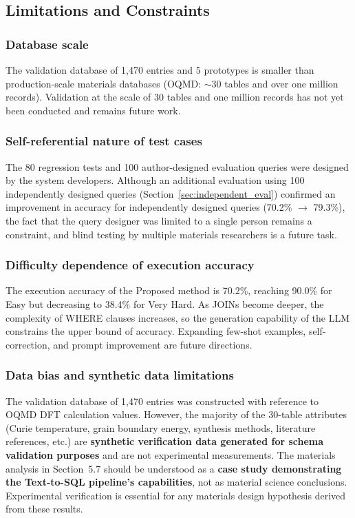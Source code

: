 \documentclass[5p,twocolumn]{elsarticle}
\begin{document}
\subsection{Limitations and Constraints}
\label{sec:limitations}

\subsubsection{Database scale}

The validation database of 1{,}470 entries and 5 prototypes
is smaller than production-scale materials databases (OQMD: ${\sim}30$ tables and over one million records).
Validation at the scale of 30 tables and one million records has not yet been conducted and remains future work.

\subsubsection{Self-referential nature of test cases}

The 80 regression tests and 100 author-designed evaluation queries
were designed by the system developers.
Although an additional evaluation using 100 independently designed queries (Section~\ref{sec:independent_eval})
confirmed an improvement in accuracy for independently designed queries (70.2\% $\to$ 79.3\%),
the fact that the query designer was limited to a single person remains a constraint,
and blind testing by multiple materials researchers is a future task.

\subsubsection{Difficulty dependence of execution accuracy}

The execution accuracy of the Proposed method is 70.2\%, reaching 90.0\% for Easy but decreasing to 38.4\% for Very Hard.
As JOINs become deeper, the complexity of WHERE clauses increases,
so the generation capability of the LLM constrains the upper bound of accuracy.
Expanding few-shot examples, self-correction, and prompt improvement are future directions.

\subsubsection{Data bias and synthetic data limitations}

The validation database of 1{,}470 entries was constructed with reference to OQMD DFT calculation values.
However, the majority of the 30-table attributes (Curie temperature, grain boundary energy, synthesis methods,
literature references, etc.) are \textbf{synthetic verification data generated for schema validation purposes}
and are not experimental measurements.
The materials analysis in Section~5.7 should be understood as a \textbf{case study demonstrating the
Text-to-SQL pipeline's capabilities}, not as material science conclusions.
Experimental verification is essential for any materials design hypothesis derived from these results.
\end{document}
